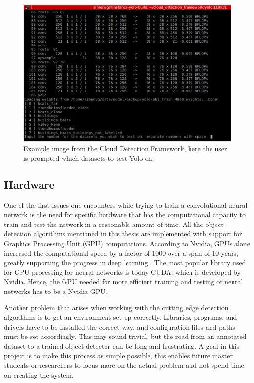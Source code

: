 \begin{figure}[h!]
    \centering
    \includegraphics[width=0.8 \textwidth]{images/cloud_detection_pic.eps}
    \caption{Example image from the Cloud Detection Framework, here the user is prompted which datasets to test Yolo on.}
    \label{fig:cloud_det}
\end{figure}

\subsection{Hardware}
One of the first issues one encounters while trying to train a convolutional neural network is the need for specific hardware that has the computational capacity to train and test the network in a reasonable amount of time. All the object detection algorithms mentioned in this thesis are implemented with support for Graphics Processing Unit (GPU) computations. According to Nvidia, GPUs alone increased the computational speed by a factor of 1000 over a span of 10 years, greatly supporting the progress in deep learning \citep{Dettmers2015}. The most popular library used for GPU processing for neural networks is today CUDA, which is developed by Nvidia. Hence, the GPU needed for more efficient training and testing of neural networks has to be a Nvidia GPU. 

\vspace{3mm}

Another problem that arises when working with the cutting edge detection algorithms is to get an environment set up correctly. Libraries, programs, and drivers have to be installed the correct way, and configuration files and paths must be set accordingly. This may sound trivial, but the road from an annotated dataset to a trained object detector can be long and frustrating. A goal in this project is to make this process as simple possible, this enables future master students or researchers to focus more on the actual problem and not spend time on creating the system. 

